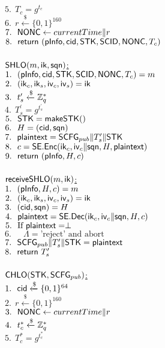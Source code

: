  $5.\ \ T_c = g^{t_c}$ \\
 $6.\ \ r \xleftarrow{\$} \{0,1\}^{160}$ \\
 $7.\ \ \mathsf{NONC} \leftarrow currentTime \| r$ \\
 $8.\ \ \mathsf{return}\ (\mathsf{pInfo}, \mathsf{cid}, \mathsf{STK}, \mathsf{SCID}, \mathsf{NONC}, T_c)$ \\
\\
\underline{$\mathsf{SHLO}(m, \mathsf{ik}, \mathsf{sqn})$:} \\
 $1.\ \ (\mathsf{pInfo}, \mathsf{cid}, \mathsf{STK}, \mathsf{SCID}, \mathsf{NONC}, T_c) = m$ \\
 $2.\ \ (\mathsf{ik}_c, \mathsf{ik}_s, \mathsf{iv}_c, \mathsf{iv}_s) = \mathsf{ik}$ \\
 $3.\ \ t_s^{\prime} \xleftarrow{\$} \mathbb{Z}_{q}^{\ast}$ \\
 $4.\ \ T_s^{\prime} = g^{t_s^{\prime}}$ \\
 $5.\ \ \mathsf{STK} = \mathsf{makeSTK}()$ \\
 $6.\ \ H = (\mathsf{cid}, \mathsf{sqn})$ \\
 $7.\ \ \mathsf{plaintext} = \mathsf{SCFG}_{pub} \| T_s^{\prime} \| \mathsf{STK} $\\
 $8.\ \ c = \mathsf{SE}.\mathsf{Enc}(\mathsf{ik}_c, \mathsf{iv}_c \| \mathsf{sqn}, H, \mathsf{plaintext})$ \\
 $9.\ \ \mathsf{return}\ (\mathsf{pInfo}, H, c)$ \\
\\
\underline{$\mathsf{receiveSHLO}(m, \mathsf{ik})$:} \\
 $1.\ \ (\mathsf{pInfo}, H, c) = m$ \\
 $2.\ \ (\mathsf{ik}_c, \mathsf{ik}_s, \mathsf{iv}_c, \mathsf{iv}_s) = \mathsf{ik}$ \\
 $3.\ \ (\mathsf{cid}, \mathsf{sqn}) = H$ \\
 $4.\ \ \mathsf{plaintext} = \mathsf{SE}.\mathsf{Dec}(\mathsf{ik}_c, \mathsf{iv}_c \| \mathsf{sqn}, H, c)$ \\
 $5.\ \ \text{If }\mathsf{plaintext} = \perp$ \\
 $6.\ \ \quad \Lambda = \text{'reject' and abort}$ \\
 $7.\ \ \mathsf{SCFG}_{pub} \| T_s^{\prime} \| \mathsf{STK}  = \mathsf{plaintext} $ \\
 $8.\ \ \mathsf{return}\ T_s^{\prime}$ \\
\\
\underline{$\mathsf{CHLO}(\mathsf{STK}, \mathsf{SCFG}_{pub})$:} \\
 $1.\ \ \mathsf{cid} \xleftarrow{\$} \{0,1\}^{64}$ \\
 $2.\ \ r \xleftarrow{\$} \{0,1\}^{160}$ \\
 $3.\ \ \mathsf{NONC} \leftarrow currentTime \| r$ \\
 $4.\ \ t_c^{\ast} \xleftarrow{\$} \mathbb{Z}_{q}^{\ast}$ \\
 $5.\ \ T_c^{\ast} = g^{t_c^{\ast}}$ \\
